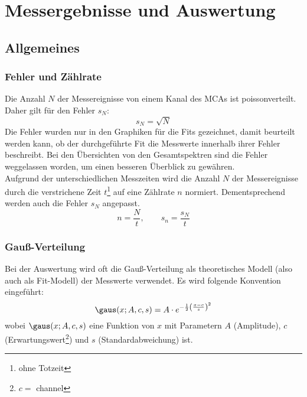 \section{Messergebnisse und Auswertung}
\subsection{Allgemeines}
\subsubsection{Fehler und Zählrate}
\label{subsub:errorsandcounts}
Die Anzahl $N$ der Messereignisse von einem Kanal des MCAs ist poissonverteilt. Daher gilt für den Fehler $s_N$:
\begin{equation}
\label{eq:poisson:error}
  s_N = \sqrt{N}
\end{equation} 
Die Fehler wurden nur in den Graphiken für die Fits gezeichnet, damit beurteilt werden kann, ob der durchgeführte Fit die Messwerte innerhalb
ihrer Fehler beschreibt. Bei den Übersichten von den Gesamtspektren sind die Fehler weggelassen worden, um einen besseren Überblick zu gewähren. \\[\baselineskip]
Aufgrund der unterschiedlichen Messzeiten wird die Anzahl $N$ der Messereignisse durch die verstrichene Zeit $t$\footnote{ohne Totzeit}
auf eine Zählrate $n$ normiert. Dementsprechend werden auch die Fehler $s_N$ angepasst.
\begin{equation}
\label{eq:countrate}
  n = \frac{N}{t}, \qquad s_n = \frac{s_N}{t}
\end{equation}

\subsubsection{Gauß-Verteilung}
\label{subsub:gaus}
Bei der Auswertung wird oft die Gauß-Verteilung als theoretisches Modell (also auch als Fit-Modell) der Messwerte verwendet. Es wird folgende 
Konvention eingeführt:
\begin{equation}
  \label{eq:gaus}
  \gaus(x; A, c, s) = A \cdot e^{-\frac{1}{2} \left( \frac{x - c}{s} \right)^2}
\end{equation}
wobei $\gaus(x; A, c, s)$ eine Funktion von $x$ mit Parametern $A$ (Amplitude), $c$ (Erwartungswert\footnote{$c=$ channel}) und 
$s$ (Standardabweichung) ist.

